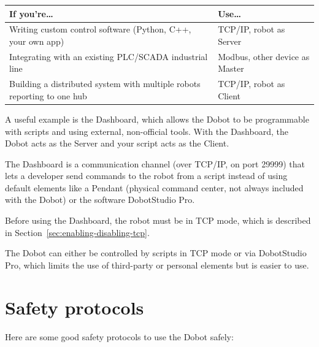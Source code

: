 \documentclass[11pt,a4paper]{article}
\begin{document}
\begin{longtable}{@{}p{7cm}p{7cm}@{}}
\toprule
\textbf{If you're\ldots} & \textbf{Use\ldots} \\
\midrule
\endhead
Writing custom control software (Python, C++, your own app) & TCP/IP, robot as Server \\ \midrule
Integrating with an existing PLC/SCADA industrial line & Modbus, other device as Master \\ \midrule
Building a distributed system with multiple robots reporting to one hub & TCP/IP, robot as Client \\
\bottomrule
\end{longtable}

A useful example is the Dashboard, which allows the Dobot to be programmable with scripts and using external, non-official tools. With the Dashboard, the Dobot acts as the Server and your script acts as the Client.

The Dashboard is a communication channel (over TCP/IP, on port 29999) that lets a developer send commands to the robot from a script instead of using default elements like a Pendant (physical command center, not always included with the Dobot) or the software DobotStudio Pro.

Before using the Dashboard, the robot must be in TCP mode, which is described in Section~\ref{sec:enabling-disabling-tcp}.

The Dobot can either be controlled by scripts in TCP mode or via DobotStudio Pro, which limits the use of third-party or personal elements but is easier to use.

\section{Safety protocols}
\label{sec:safety}

Here are some good safety protocols to use the Dobot safely:
\end{document}
